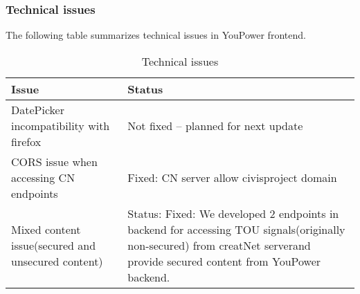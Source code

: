 \subsubsection{Technical issues}
 The following table summarizes technical issues in YouPower frontend.
\begin{table}[h!]
\caption{Technical issues}\label{tab:app_nav}
\begin{center} \footnotesize 
\begin{tabular}{ l p{6cm}}
\hline
\textbf{Issue}  &
\textbf{Status}  \\ \hline

DatePicker incompatibility with firefox
  & 
Not fixed -- planned for next update\\ 
CORS issue when accessing CN endpoints & Fixed: CN server allow civisproject domain \\ 
Mixed content issue(secured and unsecured content) & Status: Fixed: We developed 2 endpoints in backend for accessing TOU signals(originally non-secured) from creatNet serverand provide secured content from YouPower backend.\\
 \hline
\end{tabular}
\end{center} 
\end{table}